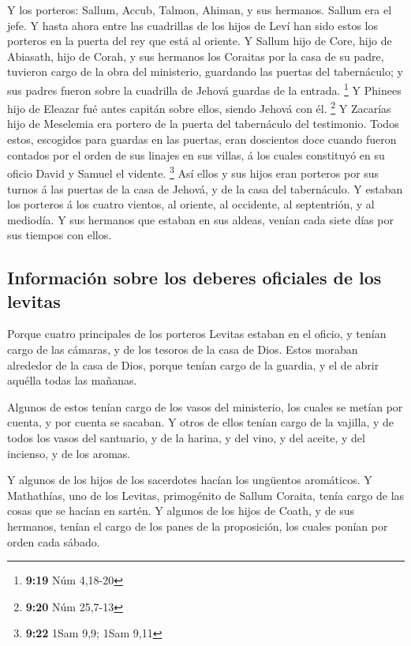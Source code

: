  Y los porteros: Sallum, Accub, Talmon, Ahiman, y sus
hermanos. Sallum era el jefe.  Y hasta ahora entre las
cuadrillas de los hijos de Leví han sido estos los porteros en la puerta
del rey que está al oriente.  Y Sallum hijo de Core, hijo
de Abiasath, hijo de Corah, y sus hermanos los Coraitas por la casa de
su padre, tuvieron cargo de la obra del ministerio, guardando las
puertas del tabernáculo; y sus padres fueron sobre la cuadrilla de
Jehová guardas de la entrada. \footnote{\textbf{9:19} Núm 4,18-20}
 Y Phinees hijo de Eleazar fué antes capitán sobre ellos,
siendo Jehová con él. \footnote{\textbf{9:20} Núm 25,7-13} 
Y Zacarías hijo de Meselemia era portero de la puerta del tabernáculo
del testimonio.  Todos estos, escogidos para guardas en las
puertas, eran doscientos doce cuando fueron contados por el orden de sus
linajes en sus villas, á los cuales constituyó en su oficio David y
Samuel el vidente. \footnote{\textbf{9:22} 1Sam 9,9; 1Sam 9,11}
 Así ellos y sus hijos eran porteros por sus turnos á las
puertas de la casa de Jehová, y de la casa del tabernáculo.
 Y estaban los porteros á los cuatro vientos, al oriente,
al occidente, al septentrión, y al mediodía.  Y sus
hermanos que estaban en sus aldeas, venían cada siete días por sus
tiempos con ellos.

\hypertarget{informaciuxf3n-sobre-los-deberes-oficiales-de-los-levitas}{%
\subsection{Información sobre los deberes oficiales de los
levitas}\label{informaciuxf3n-sobre-los-deberes-oficiales-de-los-levitas}}

 Porque cuatro principales de los porteros Levitas estaban
en el oficio, y tenían cargo de las cámaras, y de los tesoros de la casa
de Dios.  Estos moraban alrededor de la casa de Dios,
porque tenían cargo de la guardia, y el de abrir aquélla todas las
mañanas.

 Algunos de estos tenían cargo de los vasos del ministerio,
los cuales se metían por cuenta, y por cuenta se sacaban. 
Y otros de ellos tenían cargo de la vajilla, y de todos los vasos del
santuario, y de la harina, y del vino, y del aceite, y del incienso, y
de los aromas.

 Y algunos de los hijos de los sacerdotes hacían los
ungüentos aromáticos.  Y Mathathías, uno de los Levitas,
primogénito de Sallum Coraita, tenía cargo de las cosas que se hacían en
sartén.  Y algunos de los hijos de Coath, y de sus
hermanos, tenían el cargo de los panes de la proposición, los cuales
ponían por orden cada sábado.

